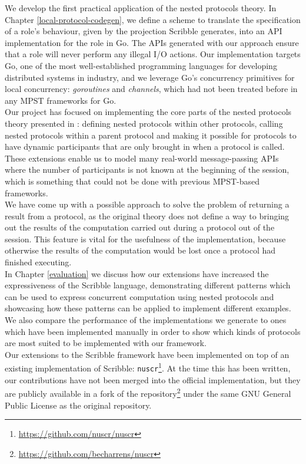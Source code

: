 \documentclass[12pt,twoside]{report}
\begin{document}
We develop the first practical application of the nested protocols theory. In Chapter \ref{local-protocol-codegen}, we define a scheme to translate the specification of a role's behaviour, given by the projection Scribble generates, into an API implementation for the role in Go. The APIs generated with our approach ensure that a role will never perform any illegal I/O actions. Our implementation targets Go, one of the most well-established programming languages for developing distributed systems in industry\cite{gousers}, and we leverage Go's concurrency primitives for local concurrency: \textit{goroutines} and \textit{channels}, which had not been treated before in any MPST frameworks for Go.\\

Our project has focused on implementing the core parts of the nested protocols theory presented in \cite{nestedprotocols}: defining nested protocols within other protocols, calling nested protocols within a parent protocol and making it possible for protocols to have dynamic participants that are only brought in when a protocol is called. These extensions enable us to model many real-world message-passing APIs where the number of participants is not known at the beginning of the session, which is something that could not be done with previous MPST-based frameworks.\\

We have come up with a possible approach to solve the problem of returning a result from a protocol, as the original theory does not define a way to bringing out the results of the computation carried out during a protocol out of the session. This feature is vital for the usefulness of the implementation, because otherwise the results of the computation would be lost once a protocol had finished executing.\\

In Chapter \ref{evaluation} we discuss how our extensions have increased the expressiveness of the Scribble language, demonstrating different patterns which can be used to express concurrent computation using nested protocols and showcasing how these patterns can be applied to implement different examples. We also compare the performance of the implementations we generate to ones which have been implemented manually in order to show which kinds of protocols are most suited to be implemented with our framework.\\

Our extensions to the Scribble framework have been implemented on top of an existing implementation of Scribble: \texttt{nuscr}\footnote{\href{https://github.com/nuscr/nuscr}{https://github.com/nuscr/nuscr}}. At the time this has been written, our contributions have not been merged into the official implementation, but they are publicly available in a fork of the repository\footnote{\href{https://github.com/becharrens/nuscr}{https://github.com/becharrens/nuscr}} under the same GNU General Public License as the original repository.\\
\end{document}
